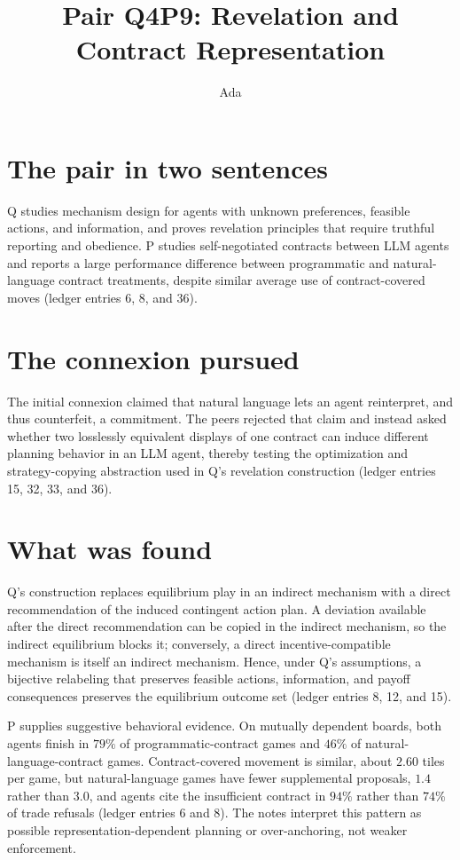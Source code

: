 \documentclass{article}
\title{Pair Q4P9: Revelation and Contract Representation}
\author{Ada}
\date{}
\begin{document}
\maketitle

\section{The pair in two sentences}
Q studies mechanism design for agents with unknown preferences, feasible actions,
and information, and proves revelation principles that require truthful reporting
and obedience. P studies self-negotiated contracts between LLM agents and reports
a large performance difference between programmatic and natural-language contract
treatments, despite similar average use of contract-covered moves (ledger entries
6, 8, and 36).

\section{The connexion pursued}
The initial connexion claimed that natural language lets an agent reinterpret, and
thus counterfeit, a commitment. The peers rejected that claim and instead asked
whether two losslessly equivalent displays of one contract can induce different
planning behavior in an LLM agent, thereby testing the optimization and
strategy-copying abstraction used in Q's revelation construction (ledger entries
15, 32, 33, and 36).

\section{What was found}
Q's construction replaces equilibrium play in an indirect mechanism with a direct
recommendation of the induced contingent action plan. A deviation available after
the direct recommendation can be copied in the indirect mechanism, so the indirect
equilibrium blocks it; conversely, a direct incentive-compatible mechanism is
itself an indirect mechanism. Hence, under Q's assumptions, a bijective relabeling
that preserves feasible actions, information, and payoff consequences preserves
the equilibrium outcome set (ledger entries 8, 12, and 15).

P supplies suggestive behavioral evidence. On mutually dependent boards, both
agents finish in \(79\%\) of programmatic-contract games and \(46\%\) of
natural-language-contract games. Contract-covered movement is similar, about
\(2.60\) tiles per game, but natural-language games have fewer supplemental
proposals, \(1.4\) rather than \(3.0\), and agents cite the insufficient contract
in \(94\%\) rather than \(74\%\) of trade refusals (ledger entries 6 and 8).
The notes interpret this pattern as possible representation-dependent planning or
over-anchoring, not weaker enforcement.
\end{document}
